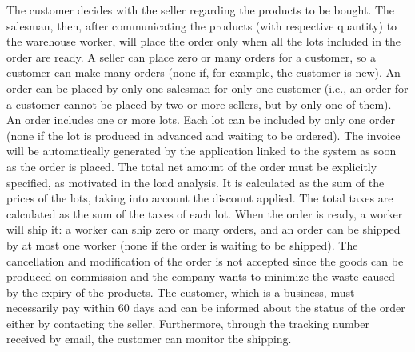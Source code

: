 The customer decides with the seller regarding the products to be bought. The salesman, then, after communicating the products (with respective quantity) to the warehouse worker, will place the order only when all the lots included in the order are ready. A seller can place zero or many orders for a customer, so a customer can make many orders (none if, for example, the customer is new). An order can be placed by only one salesman for only one customer (i.e., an order for a customer cannot be placed by two or more sellers, but by only one of them). An order includes one or more lots. Each lot can be included by only one order (none if the lot is produced in advanced and waiting to be ordered). The invoice will be automatically generated by the application linked to the system as soon as the order is placed. The total net amount of the order must be explicitly specified, as motivated in the load analysis. It is calculated as the sum of the prices of the lots, taking into account the discount applied. The total taxes are calculated as the sum of the taxes of each lot.
When the order is ready, a worker will ship it: a worker can ship zero or many orders, and an order can be shipped by at most one worker (none if the order is waiting to be shipped). The cancellation and modification of the order is not accepted since the goods can be produced on commission and the company wants to minimize the waste caused by the expiry of the products. The customer, which is a business, must necessarily pay within 60 days and can be informed about the status of the order either by contacting the seller. Furthermore, through the tracking number received by email, the customer can monitor the shipping.
